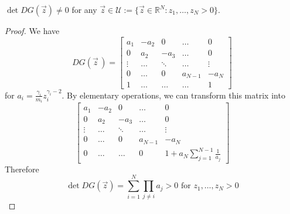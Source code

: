 \documentclass[10pt,a4paper]{amsart}
\begin{document}
\begin{prop}\label{det}
    $\det DG(\vec z)\neq 0$ for any $\vec z \in \mathcal{U} :=\{\vec z\in\mathbb{R}^N: z_1,\dots,z_N > 0\}$.
\end{prop}

\begin{proof}
    We have
    \[ DG(\vec z\,) = \begin{bmatrix}
        a_1 & -a_2 & 0 & \dots & 0 \\
        0 & a_2 & -a_3 & \dots & 0 \\
        \vdots & \dots & \ddots & \dots & \vdots \\
        0 & \dots & 0 & a_{N-1} & -a_N \\
        1 & \dots & \dots & \dots & 1
    \end{bmatrix}\]
    for $a_i = \frac{\gamma_i}{m_i}z_i^{\gamma_i-2}$. By elementary operations, we can transform this matrix into
    \[\begin{bmatrix}
        a_1 & -a_2 & 0 & \dots & 0 \\
        0 & a_2 & -a_3 & \dots & 0 \\
        \vdots & \dots & \ddots & \dots & \vdots \\
        0 & \dots & 0 & a_{N-1} & -a_N \\
        0 & \dots & \dots & 0 & 1+a_N\sum_{j=1}^{N-1}\frac{1}{a_j}
    \end{bmatrix}\]
    Therefore 
    \[ \det DG(\vec z) = \sum_{i=1}^N\prod_{j\neq i}a_j >0 
    \text{ \ \ \ \ \ \ for \ \ $z_1,\dots,z_N>0$} \]
\end{proof}
\end{document}
